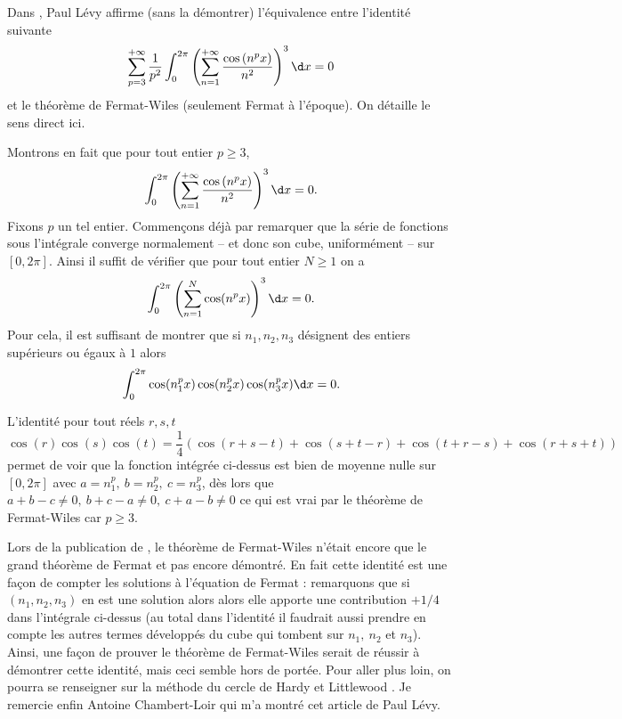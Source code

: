 \documentclass{notes}
\begin{document}

Dans \cite{Levy}, Paul Lévy affirme (sans la démontrer) l'équivalence entre l'identité suivante
\[ \sum_{p=3}^{+\infty} \frac{1}{p^{2}} \int_{0}^{2\pi} \left( \sum_{n=1}^{+\infty} \frac{\cos\left( n^{p }x \right)}{n^{2}} \right)^{3}  \d x = 0  \]
et le théorème de Fermat-Wiles (seulement Fermat à l'époque). On détaille le sens direct ici.

Montrons en fait que pour tout entier $p\geq 3$, 
\[ \int_{0}^{2\pi} \left( \sum_{n=1}^{+\infty} \frac{\cos\left( n^{p }x \right)}{n^{2}} \right)^{3}  \d x = 0 .  \]
Fixons $p$ un tel entier. Commençons déjà par remarquer que la série de fonctions sous l'intégrale converge normalement -- et donc son cube, uniformément -- sur $[0,2\pi]$. Ainsi il suffit de vérifier que pour tout entier $N\geq 1$ on a 
\[  \int_{0}^{2\pi}   \left( \sum_{n=1}^{N} \cos(n^{p}x) \right)^{3} \d x = 0. \]
Pour cela, il est suffisant de montrer que si $n_1,n_2,n_3$ désignent des entiers supérieurs ou égaux à $1$ alors 
\[ \int_{0}^{2\pi} \cos(n_1^{p} x)\cos(n_2^{p}x) \cos(n_3^{p}x) \d x = 0.\]

L'identité pour tout réels $r,s,t$ 
\[\cos \left( r \right) \cos \left( s \right) \cos \left( t \right) = \frac 14 \left( \cos(r+s-t)+\cos(s+t-r) + \cos(t+r-s) + \cos(r+s+t) \right)\]
permet de voir que la fonction intégrée ci-dessus est bien de moyenne nulle sur $[0,2\pi]$ avec $a=n_1^{p},\ b=n_2^{p},\ c=n_3^{p}$, dès lors que $a+b-c \neq 0,\ b+c-a \neq 0,\ c+a-b \neq 0$ ce qui est vrai par le théorème de Fermat-Wiles car $p \geq 3$.  


\begin{rem}
  Lors de la publication de \cite{Levy}, le théorème de Fermat-Wiles n'était encore que le grand théorème de Fermat et pas encore démontré. En fait cette identité est une façon de compter les solutions à l'équation de Fermat : remarquons que si $(n_1,n_2,n_3)$ en est une solution alors alors elle apporte une contribution $+1/4$ dans l'intégrale ci-dessus (au total dans l'identité il faudrait aussi prendre en compte les autres termes développés du cube qui tombent sur $n_1,\ n_2$ et $n_3$).  Ainsi, une façon de prouver le théorème de Fermat-Wiles serait de réussir à démontrer cette identité, mais ceci semble hors de portée. Pour aller plus loin, on pourra se renseigner sur la méthode du cercle de Hardy et Littlewood \cite{HW}.   Je remercie enfin Antoine Chambert-Loir qui m'a montré cet article de Paul Lévy.
\end{rem}





 
\end{document}
